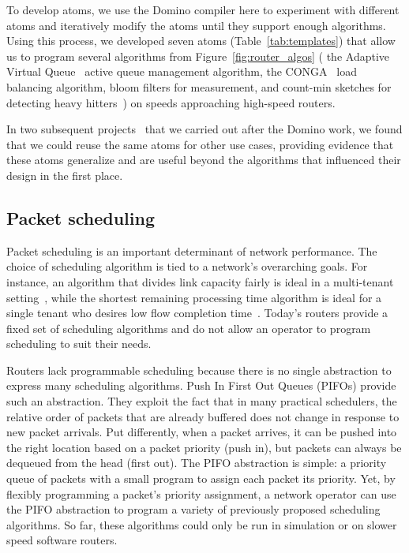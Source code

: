 To develop atoms, we use the Domino compiler here to experiment with different
atoms and iteratively modify the atoms until they support enough algorithms.
Using this process, we developed seven atoms (Table~\ref{tab:templates}) that
allow us to program several algorithms from Figure~\ref{fig:router_algos} (\eg
the Adaptive Virtual Queue~\cite{avq} active queue management algorithm, the
CONGA~\cite{conga} load balancing algorithm, bloom filters for measurement, and
count-min sketches for detecting heavy hitters~\cite{opensketch}) on speeds
approaching high-speed routers.

In two subsequent projects~\cite{hula, perf_query} that we carried out after
the Domino work, we found that we could reuse the same atoms for other use
cases, providing evidence that these atoms generalize and are useful beyond the
algorithms that influenced their design in the first place.

\subsection{Packet scheduling}

Packet scheduling is an important determinant of network performance. The
choice of scheduling algorithm is tied to a network's overarching goals. For
instance, an algorithm that divides link capacity fairly is ideal in a
multi-tenant setting~\cite{wfq}, while the shortest remaining processing time
algorithm is ideal for a single tenant who desires low flow completion
time~\cite{pFabric}. Today's routers provide a fixed set of scheduling
algorithms and do not allow an operator to program scheduling to suit their
needs.

Routers lack programmable scheduling because there is no single abstraction to
express many scheduling algorithms. Push In First Out Queues (PIFOs) provide
such an abstraction. They exploit the fact that in many practical schedulers,
the relative order of packets that are already buffered does not change in
response to new packet arrivals. Put differently, when a packet arrives, it can
be pushed into the right location based on a packet priority (push in), but
packets can always be dequeued from the head (first out). The PIFO abstraction
is simple: a priority queue of packets with a small program to assign each
packet its priority. Yet, by flexibly programming a packet's priority
assignment, a network operator can use the PIFO abstraction to program a
variety of previously proposed scheduling algorithms. So far, these algorithms
could only be run in simulation or on slower speed software routers.


